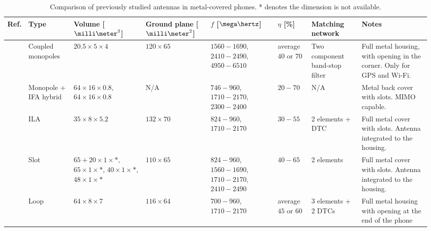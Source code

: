 \begin{table}
\centering
\caption{Comparison of previously studied antennas in metal-covered phones. * denotes the dimension is not available.}
\begin{tabular}{|M{0.03\textheight}|M{0.11\textheight}|M{0.1\textheight}|M{0.11\textheight}|M{0.1\textheight}|M{0.07\textheight}|M{0.15\textheight}|M{0.18\textheight}|}
    \hline
    \textbf{Ref.} & \textbf{Type} & \textbf{Volume [$\milli\meter^3$]} & \textbf{Ground plane [$\milli\meter^2$]} & \textbf{$f$ [$\mega\hertz$]} & \textbf{$\eta$ [\%]} & \textbf{Matching network} & \textbf{Notes}\\
    \hline
    \cite{wu_pier} & Coupled monopoles & $20.5\times5\times4$ & $120\times65$ & $1560-1690$, $2410-2490$, $4950-6510$ & average $40$ or $70$ & Two component band-stop filter & Full metal housing, with opening in the corner. Only for GPS and Wi-Fi.\\
    \hline
    \cite{son_wideband_mimo} & Monopole + IFA hybrid & $64\times16\times0.8$, $64\times16\times0.8$ & N/A & $746-960$, $1710-2170$, $2300-2400$ & $20-70$ & N/A & Metal back cover with slots. MIMO capable.\\
    \hline
    \cite{wu_tunable} & ILA & $35\times8\times5.2$ & $132\times70$ & $824-960$, $1710-2170$ & $30-55$ & 2 elements + DTC & Full metal cover with slots. Antenna integrated to the housing.\\
    \hline
    \cite{zhong_pier} & Slot & $65+20\times1\times*$, $65\times1\times*$, $40\times1\times*$, $48\times1\times*$ & $110\times65$ & $824-960$, $1560-1690$, $1710-2170$, $2410-2490$ & $40-65$ & 2 elements & Full metal cover with slots. Antenna integrated to the housing.\\
    \hline
    \cite{chen_compact_lte} & Loop & $64\times8\times7$ & $116\times64$ & $700-960$, $1710-2170$ & average $45$ or $60$ & 3 elements + 2 DTCs & Full metal housing with opening at the end of the phone\\
    \hline
\end{tabular}
\end{table}

\clearpage